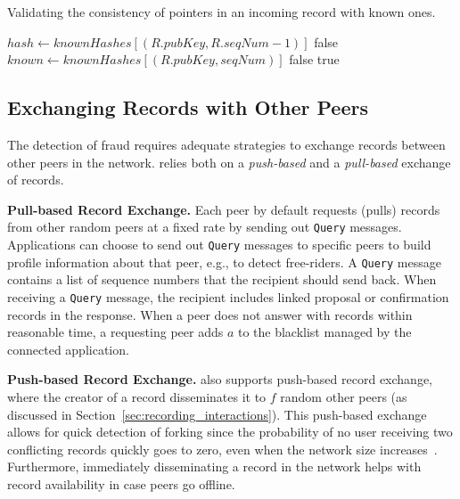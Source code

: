 \begin{algorithm}[t]
	\label{alg:record_validation_step4}
	\caption{Validating the consistency of pointers in an incoming record with known ones.}
	\begin{algorithmic}[1]
		
		  
		\State $ hash \leftarrow knownHashes[(R.pubKey, R.seqNum - 1)] $
		\State \Return false
		\EndIf
		\State
		\State $ known \leftarrow knownHashes[(R.pubKey, seqNum)] $
		\State \Return false
		\EndIf
		\EndFor
		\State \Return true
		\EndProcedure
		
	\end{algorithmic}
\end{algorithm}

\subsection{Exchanging Records with Other Peers}
\label{sec:exchanging_records}
The detection of fraud requires adequate strategies to exchange records between other peers in the network.
\ModelName{} relies both on a \emph{push-based} and a \emph{pull-based} exchange of records.

\textbf{Pull-based Record Exchange.}
Each peer by default requests (pulls) records from other random peers at a fixed rate by sending out \texttt{Query} messages.
Applications can choose to send out \texttt{Query} messages to specific peers to build profile information about that peer, e.g., to detect free-riders.
A \texttt{Query} message contains a list of sequence numbers that the recipient should send back.
When receiving a \texttt{Query} message, the recipient includes linked proposal or confirmation records in the response.
When a peer does not answer with records within reasonable time, a requesting peer adds $ a $ to the blacklist managed by the connected application.

\textbf{Push-based Record Exchange.}
\ModelName{} also supports push-based record exchange, where the creator of a record disseminates it to $ f $ random other peers (as discussed in Section~\ref{sec:recording_interactions}).
This push-based exchange allows for quick detection of forking since the probability of no user receiving two conflicting records quickly goes to zero, even when the network size increases~\cite{osipkov2007combating}.
Furthermore, immediately disseminating a record in the network helps with record availability in case peers go offline.

